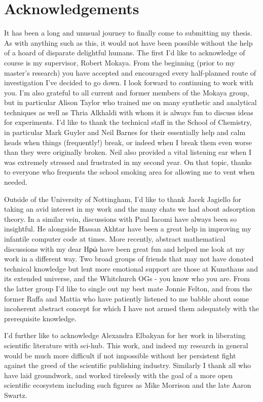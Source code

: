 \cleardoublepage

\chapter*{Acknowledgements}

It has been a long and unusual journey to finally come to submitting my thesis. As with anything such as this, it would not have been possible without the help of a hoard of disparate delightful humans. The first I'd like to acknowledge of course is my supervisor, Robert Mokaya. From the beginning (prior to my master's research) you have accepted and encouraged every half-planned route of investigation I've decided to go down. I look forward to continuing to work with you. I'm also grateful to all current and former members of the Mokaya group, but in particular Alison Taylor who trained me on many synthetic and analytical techniques as well as Thria Alkhaldi with whom it is always fun to discuss ideas for experiments. I'd like to thank the technical staff in the School of Chemistry, in particular Mark Guyler and Neil Barnes for their essentially help and calm heads when things (frequently!) break, or indeed when I break them even worse than they were originally broken. Neil also provided a vital listening ear when I was extremely stressed and frustrated in my second year. On that topic, thanks to everyone who frequents the school smoking area for allowing me to vent when needed.

Outside of the University of Nottingham, I'd like to thank Jacek Jagiello for taking an avid interest in my work and the many chats we had about adsorption theory. In a similar vein, discussions with Paul Iacomi have always been so insightful. He alongside Hassan Akhtar have been a great help in improving my infantile computer code at times. More recently, abstract mathematical discussions with my dear \textgreek{Ηρώ} have been great fun and helped me look at my work in a different way. Two broad groups of friends that may not have donated technical knowledge but lent more emotional support are those at Kunsthaus and its extended universe, and the Whitchurch OGs - you know who you are. From the latter group I'd like to single out my best mate Jonnie Felton, and from the former Raffa and Mattia who have patiently listened to me babble about some incoherent abstract concept for which I have not armed them adequately with the prerequisite knowledge.

I'd further like to acknowledge Alexandra Elbakyan for her work in liberating scientific literature with sci-hub. This work, and indeed my research in general would be much more difficult if not impossible without her persistent fight against the greed of the scientific publishing industry. Similarly I thank all who have laid groundwork, and worked tirelessly with the goal of a more open scientific ecosystem including such figures as Mike Morrison and the late Aaron Swartz.

